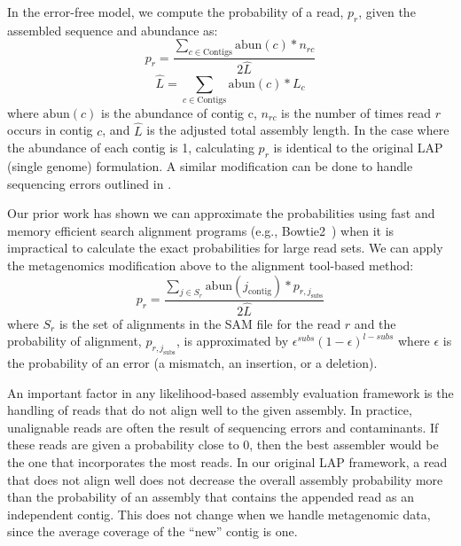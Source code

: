 \documentclass[12pt,\mydriver]{thesis}
\begin{document}
In the error-free model, we compute the probability of a read, $p_r$, given the assembled sequence and abundance as:
\begin{equation}
  \label{meta_read_probability}
  p_r = \frac{\sum_{c \in \text{Contigs}}\text{abun}(c)*n_{rc}}{2\hat{L}}
\end{equation}
\begin{equation}
  \label{meta_read_length}
  \hat{L} = \sum_{c \in \text{Contigs}}\text{abun}(c)*L_{c}
\end{equation}
where $\text{abun}(c)$ is the abundance of contig c, $n_{rc}$ is the number of times read $r$ occurs in contig $c$, and $\hat{L}$ is the adjusted total assembly length.  In the case where the abundance of each contig is 1, calculating $p_r$ is identical to the original LAP (single genome) formulation.  A similar modification can be done to handle sequencing errors outlined in \cite{LAP}.

Our prior work has shown we can approximate the probabilities using fast and memory efficient search alignment programs (e.g., Bowtie2~\cite{langmead2012fast}) when it is impractical to calculate the exact probabilities for large read sets.
We can apply the metagenomics modification above to the alignment tool-based method:
\begin{equation}
\label{}
p_{r} = \frac{\sum_{j \in S_r} \text{abun}(j_{\text{contig}})*p_{r,j_{\text{subs}}}}{2\hat{L}}
\end{equation}
where $S_r$ is the set of alignments in the SAM file for the read $r$ and the probability of alignment, $p_{r,j_{\text{subs}}}$, is approximated by $\epsilon^{subs}(1 - \epsilon)^{l - subs}$ where $\epsilon$ is the probability of an error (a mismatch, an insertion, or a deletion).




An important factor in any likelihood-based assembly evaluation framework is the handling of reads that do not align well to the given assembly.
In practice, unalignable reads are often the result of sequencing errors and contaminants.
If these reads are given a probability close to 0, then the best assembler would be the one that incorporates the most reads.
In our original LAP framework, a read that does not align well does not decrease the overall assembly probability more than the probability of an assembly that contains the appended read as an independent contig.
This does not change when we handle metagenomic data, since the average coverage of the ``new'' contig is one.
\end{document}
